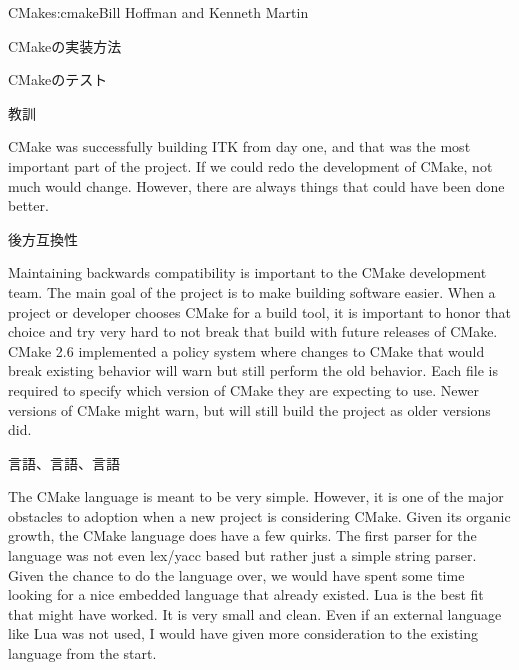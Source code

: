\begin{aosachapter}{CMake}{s:cmake}{Bill Hoffman and Kenneth Martin}
\begin{aosasect1}{CMakeの実装方法}
\begin{aosasect2}{CMakeのテスト}
\end{aosasect2}

\end{aosasect1}

\begin{aosasect1}{教訓}

CMake was successfully building ITK from day one, and that was the
most important part of the project. If we could redo the development
of CMake, not much would change. However, there are always things that
could have been done better.

\begin{aosasect2}{後方互換性}

Maintaining backwards compatibility is important to the CMake
development team. The main goal of the project is to make building
software easier. When a project or developer chooses CMake for a build
tool, it is important to honor that choice and try very hard to not
break that build with future releases of CMake. CMake 2.6 implemented
a policy system where changes to CMake that would break existing
behavior will warn but still perform the old behavior. Each
 file is required to specify which version of
CMake they are expecting to use.  Newer versions of CMake might warn,
but will still build the project as older versions did.

\end{aosasect2}

\begin{aosasect2}{言語、言語、言語}

The CMake language is meant to be very simple. However, it is one of
the major obstacles to adoption when a new project is considering
CMake. Given its organic growth, the CMake language does have a few
quirks. The first parser for the language was not even lex/yacc based
but rather just a simple string parser. Given the chance to do the
language over, we would have spent some time looking for a nice
embedded language that already existed. Lua is the best fit that might
have worked. It is very small and clean. Even if an external language
like Lua was not used, I would have given more consideration to the
existing language from the start.

\end{aosasect2}


\end{aosasect1}
\end{aosachapter}
